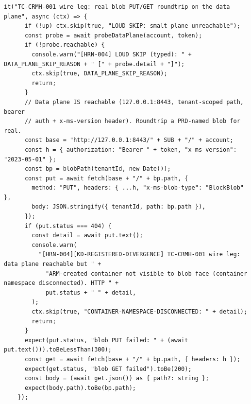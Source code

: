 \documentclass[10pt,twoside,openany]{book}
\theoremstyle{plain}
\theoremstyle{definition}
\theoremstyle{remark}
\begin{document}
\begin{lstlisting}[caption={apps/web/test/harness/crmh/crmh.test.ts}]
    it("TC-CRMH-001 wire leg: real blob PUT/GET roundtrip on the data plane", async (ctx) => {
      if (!up) ctx.skip(true, "LOUD SKIP: smalt plane unreachable");
      const probe = await probeDataPlane(account, token);
      if (!probe.reachable) {
        console.warn("[HRN-004] LOUD SKIP (typed): " + DATA_PLANE_SKIP_REASON + " [" + probe.detail + "]");
        ctx.skip(true, DATA_PLANE_SKIP_REASON);
        return;
      }
      // Data plane IS reachable (127.0.0.1:8443, tenant-scoped path, bearer
      // auth + x-ms-version header). Roundtrip a PRD-named blob for real.
      const base = "http://127.0.0.1:8443/" + SUB + "/" + account;
      const h = { authorization: "Bearer " + token, "x-ms-version": "2023-05-01" };
      const bp = blobPath(tenantId, new Date());
      const put = await fetch(base + "/" + bp.path, {
        method: "PUT", headers: { ...h, "x-ms-blob-type": "BlockBlob" },
        body: JSON.stringify({ tenantId, path: bp.path }),
      });
      if (put.status === 404) {
        const detail = await put.text();
        console.warn(
          "[HRN-004][KD-REGISTERED-DIVERGENCE] TC-CRMH-001 wire leg: data plane reachable but " +
            "ARM-created container not visible to blob face (container namespace disconnected). HTTP " +
            put.status + " " + detail,
        );
        ctx.skip(true, "CONTAINER-NAMESPACE-DISCONNECTED: " + detail);
        return;
      }
      expect(put.status, "blob PUT failed: " + (await put.text())).toBeLessThan(300);
      const get = await fetch(base + "/" + bp.path, { headers: h });
      expect(get.status, "blob GET failed").toBe(200);
      const body = (await get.json()) as { path?: string };
      expect(body.path).toBe(bp.path);
    });


\end{lstlisting}
\end{document}
